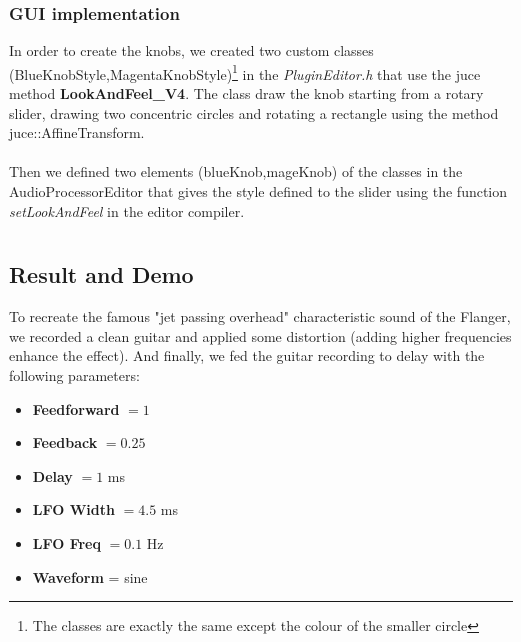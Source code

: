 \documentclass[a4paper,12pt]{report}
\begin{document}
\subsection{GUI implementation}
In order to create the knobs, we created two custom classes (BlueKnobStyle,MagentaKnobStyle)\footnote{The classes are exactly the same except the colour of the smaller circle} in the \emph{PluginEditor.h} that use the juce method \textbf{LookAndFeel\_V4}. The class draw the knob starting from a rotary slider, drawing two concentric circles and rotating a rectangle using the method juce::AffineTransform.\\
\\
Then we defined two elements (blueKnob,mageKnob) of the classes in the AudioProcessorEditor that gives the style defined to the slider using the function \emph{setLookAndFeel} in the editor compiler.

\chapter{}
\section{Result and Demo}
To recreate the famous "jet passing overhead" characteristic sound of the Flanger, we recorded a clean guitar and applied some distortion (adding higher frequencies enhance the effect). And finally, we fed the guitar recording to delay with the following parameters:
\begin{itemize}
\item \textbf{Feedforward} $= 1$
\item \textbf{Feedback} $= 0.25$
\item \textbf{Delay} $= 1$ ms
\item \textbf{LFO Width} $= 4.5$ ms 
\item \textbf{LFO Freq} $= 0.1$ Hz
\item \textbf{Waveform} = sine
\end{itemize}
\end{document}

